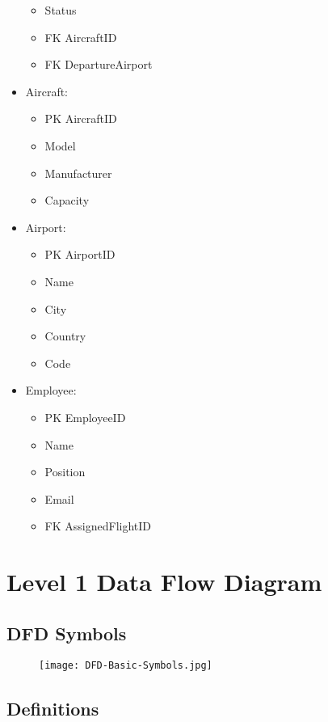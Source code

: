 \documentclass{article}
\begin{document}
\begin{itemize}
\begin{itemize}
    \item       Status
    \item FK    AircraftID
    \item FK    DepartureAirport
    \end{itemize}
\item Aircraft:
    \begin{itemize}
    \item PK    AircraftID
    \item       Model
    \item       Manufacturer
    \item       Capacity
    \end{itemize}
\item Airport:
    \begin{itemize}
    \item PK    AirportID
    \item       Name
    \item       City
    \item       Country
    \item       Code
    \end{itemize}
\item Employee:
    \begin{itemize}
    \item PK    EmployeeID
    \item       Name
    \item       Position
    \item       Email
    \item FK    AssignedFlightID
    \end{itemize}
\end{itemize}

\section{Level 1 Data Flow Diagram}


\subsection{DFD Symbols}
\begin{figure}
    \centering
    \texttt{[image: DFD-Basic-Symbols.jpg]}
    
\end{figure}

\subsection{Definitions}
\end{document}
